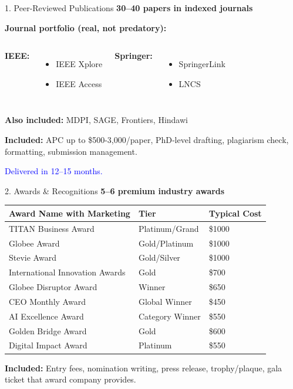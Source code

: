 \documentclass[aspectratio=169, 10pt]{beamer}
\begin{document}
	\begin{frame}{1. Peer‑Reviewed Publications}
		\faBookOpen \hspace{0.2cm} \textbf{30–40 papers in indexed journals}
		
		\textbf{Journal portfolio (real, not predatory):}
		\begin{columns}[T]
			\small
			\textbf{IEEE:}
			\begin{itemize}
				\item IEEE Xplore
				\item IEEE Access
			\end{itemize}
			\small
			\textbf{Springer:}
			\begin{itemize}
				\item SpringerLink
				\item LNCS
			\end{itemize}
			
		\end{columns}
		
		\vspace{0.3cm}
		\textbf{Also included:} MDPI, SAGE, Frontiers, Hindawi
		
		\vspace{0.2cm}
		\textbf{Included:} APC up to \$500-3,000/paper, PhD‑level drafting, plagiarism check, formatting, submission management.
		
		\vspace{0.2cm}
		\textcolor{blue}{Delivered in 12–15 months.}
	\end{frame}
	
	\begin{frame}{2. Awards \& Recognitions}
		\faTrophy \hspace{0.2cm} \textbf{5–6 premium industry awards}
		
		\begin{table}
			\centering
			\scriptsize
			\begin{tabular}{lll}
				\toprule
				Award Name with Marketing & Tier & Typical Cost \\
				\midrule
				TITAN Business Award & Platinum/Grand & \$1000 \\
				Globee Award & Gold/Platinum & \$1000 \\
				Stevie Award & Gold/Silver & \$1000 \\
				International Innovation Awards & Gold & \$700 \\
				Globee Disruptor Award & Winner & \$650 \\
				CEO Monthly Award & Global Winner & \$450 \\
				AI Excellence Award & Category Winner & \$550 \\
				Golden Bridge Award & Gold & \$600 \\
				Digital Impact Award & Platinum & \$550 \\
				\bottomrule
			\end{tabular}
		\end{table}
		
		\textbf{Included:} Entry fees, nomination writing, press release, trophy/plaque, gala ticket that award company provides.
	\end{frame}
	
\end{document}
